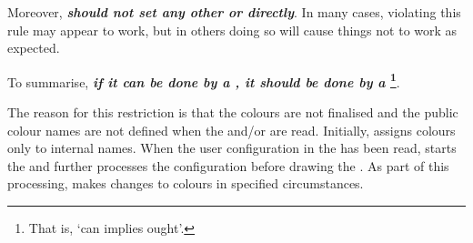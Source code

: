 \documentclass[10pt,british,a4paper]{ltxdoc}
\newcommand*\pkg[1]{\textpkg{#1}}
\begin{document}
\begin{table}
\end{table}

Moreover, \textbf{\emph{\chronosstyleslabelname{} \emph{should not} set any other \conceptname[type=colkey,no link,idx as=should not be set by,font=\normalfont]{\colkeylabelname{}} or \conceptname[type=collist,idx as=should not be set by,font=\normalfont,no link]{\collistlabelname{}} directly}}.
In many cases, violating this rule may appear to work, but in others doing so will cause things not to work as expected.

To summarise, \textbf{\emph{if it \emph{can} be done by a \conceptname[type=colscheme,no idx,no link]{\colschemelabelname{}}, it \emph{should} be done by a \conceptname[type=colscheme,no idx,no link]{\colschemelabelname{}}}\footnote{%
    That is, ‘can implies ought’.}}.

The reason for this restriction is that the colours are not finalised and the public colour names are not defined when the \colschemelabelname{} and/or \chronosstylelabelname{} are read.
Initially, \pkg{chronos} assigns colours only to internal names.
When the user configuration in the  has been read, \pkg{chronos} starts the  \envlabelname{} and further processes the configuration before drawing the .
As part of this processing, \pkg{chronos} makes changes to colours in specified circumstances.
\end{document}
